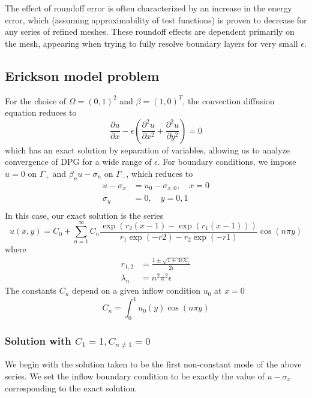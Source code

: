 \documentclass[11pt,onecolumn]{scrartcl}
\newcommand{\pd}[2]{\frac{\partial#1}{\partial#2}}
\newcommand{\pdd}[2]{\frac{\partial^2#1}{\partial#2^2}}
\begin{document}
The effect of roundoff error is often characterized by an increase in the energy error, which (assuming approximability of test functions) is proven to decrease for any series of refined meshes. These roundoff effects are dependent primarily on the mesh, appearing when trying to fully resolve boundary layers for very small $\epsilon$. 


\subsection{Erickson model problem}

For the choice of $\Omega = (0,1)^2$ and $\beta = (1,0)^T$, the convection diffusion equation reduces to
\[
\pd{u}{x} - \epsilon \left(\pdd{u}{x}+ \pdd{u}{y}\right) = 0
\]
which has an exact solution by separation of variables, allowing us to analyze convergence of DPG for a wide range of $\epsilon$.  For boundary conditions, we impose $u=0$ on $\Gamma_+$ and $\beta_n u - \sigma_n$ on $\Gamma_-$, which reduces to
\begin{align*}
u-\sigma_x &= u_0-\sigma_{x,0}, \quad x=0\\
\sigma_y &=  0, \quad y=0,1\\
\end{align*}
In this case, our exact solution is the series
\[
u(x,y) = C_0 + \sum_{n=1}^\infty C_n \frac{\exp(r_2(x-1)-\exp(r_1(x-1)))}{r_1\exp(-r2) - r_2\exp(-r1)}\cos(n\pi y)
\]
where
\begin{align*}
r_{1,2} &= \frac{1 \pm \sqrt{1 + 4 \epsilon\lambda_n}}{2 \epsilon}\\
\lambda_n &= n^2\pi^2 \epsilon
\end{align*}
The constants $C_n$ depend on a given inflow condition $u_0$ at $x=0$
\[
C_n = \int_0^1 u_0(y) \cos(n\pi y)
\]

\subsubsection{Solution with $C_1 = 1, C_{n\neq 1} = 0$}

We begin with the solution taken to be the first non-constant mode of the above series.  We set the inflow boundary condition to be exactly the value of $u-\sigma_x$ corresponding to the exact solution.  
\end{document}
